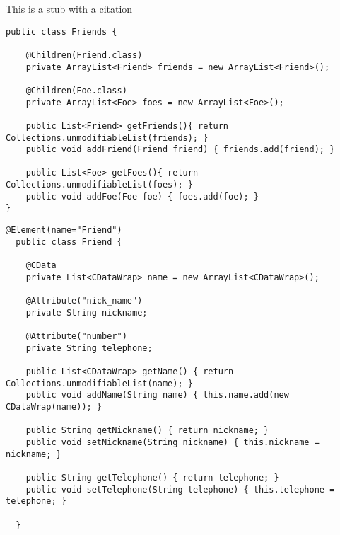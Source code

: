 \noindent This is a stub with a citation\cite{fowler03:peaa}

\begin{lstlisting}[float,caption={Friends class.},label=alg:friends,captionpos=b, frame=single, frameround=tttt]
  public class Friends {

    @Children(Friend.class)
    private ArrayList<Friend> friends = new ArrayList<Friend>();
    
    @Children(Foe.class)
    private ArrayList<Foe> foes = new ArrayList<Foe>();
    
    public List<Friend> getFriends(){ return Collections.unmodifiableList(friends); }
    public void addFriend(Friend friend) { friends.add(friend); }
    
    public List<Foe> getFoes(){ return Collections.unmodifiableList(foes); }
    public void addFoe(Foe foe) { foes.add(foe); }
}
\end{lstlisting}

\begin{lstlisting}[float,caption={Friend class.},label=alg:friend,captionpos=b, frame=single, frameround=tttt]
  @Element(name="Friend")
  public class Friend {

    @CData 
    private List<CDataWrap> name = new ArrayList<CDataWrap>();

    @Attribute("nick_name") 
    private String nickname;    

    @Attribute("number") 
    private String telephone;
    
    public List<CDataWrap> getName() { return Collections.unmodifiableList(name); }
    public void addName(String name) { this.name.add(new CDataWrap(name)); }

    public String getNickname() { return nickname; }
    public void setNickname(String nickname) { this.nickname = nickname; }

    public String getTelephone() { return telephone; }
    public void setTelephone(String telephone) { this.telephone = telephone; }
    
  }
\end{lstlisting}

